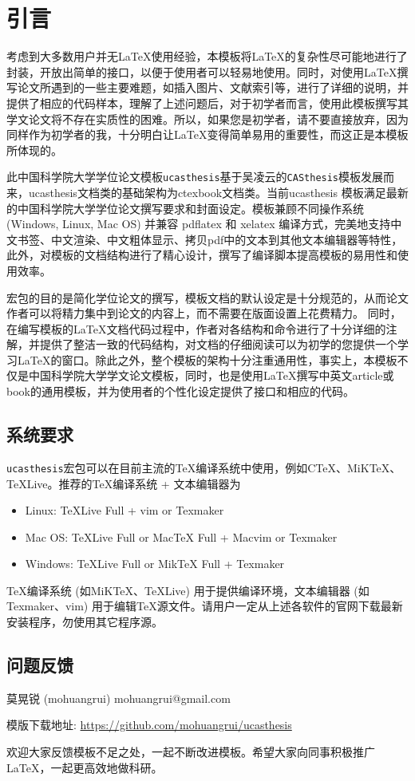 
\chapter{引言}
\label{chap:introduction}

考虑到大多数用户并无\LaTeX{}使用经验，本模板将\LaTeX{}的复杂性尽可能地进行了封装，开放出简单的接口，以便于使用者可以轻易地使用。同时，对使用\LaTeX{}撰写论文所遇到的一些主要难题，如插入图片、文献索引等，进行了详细的说明，并提供了相应的代码样本，理解了上述问题后，对于初学者而言，使用此模板撰写其学文论文将不存在实质性的困难。所以，如果您是初学者，请不要直接放弃，因为同样作为初学者的我，十分明白让\LaTeX{}变得简单易用的重要性，而这正是本模板所体现的。

此中国科学院大学学位论文模板\texttt{ucasthesis}基于吴凌云的\texttt{CASthesis}模板发展而来，ucasthesis文档类的基础架构为ctexbook文档类。当前ucasthesis 模板满足最新的中国科学院大学学位论文撰写要求和封面设定。模板兼顾不同操作系统 (Windows, Linux, Mac OS) 并兼容 pdflatex 和 xelatex 编译方式，完美地支持中文书签、中文渲染、中文粗体显示、拷贝pdf中的文本到其他文本编辑器等特性，此外，对模板的文档结构进行了精心设计，撰写了编译脚本提高模板的易用性和使用效率。

宏包的目的是简化学位论文的撰写，模板文档的默认设定是十分规范的，从而论文作者可以将精力集中到论文的内容上，而不需要在版面设置上花费精力。 同时，在编写模板的\LaTeX{}文档代码过程中，作者对各结构和命令进行了十分详细的注解，并提供了整洁一致的代码结构，对文档的仔细阅读可以为初学的您提供一个学习\LaTeX{}的窗口。除此之外，整个模板的架构十分注重通用性，事实上，本模板不仅是中国科学院大学学文论文模板，同时，也是使用\LaTeX{}撰写中英文article或book的通用模板，并为使用者的个性化设定提供了接口和相应的代码。

\section{系统要求}\label{sec:system}

\texttt{ucasthesis}宏包可以在目前主流的\TeX{}编译系统中使用，例如C\TeX{}、MiK\TeX{}、\TeX{}Live。推荐的\TeX{}编译系统 + 文本编辑器为
\begin{itemize}
    \item Linux: \TeX{}Live Full + vim or Texmaker
    \item Mac OS: \TeX{}Live Full or Mac\TeX{} Full + Macvim or Texmaker
    \item Windows: \TeX{}Live Full or Mik\TeX{} Full + Texmaker
\end{itemize}
\TeX{}编译系统 (如MiK\TeX{}、\TeX{}Live) 用于提供编译环境，文本编辑器 (如Texmaker、vim) 用于编辑\TeX{}源文件。请用户一定从上述各软件的官网下载最新安装程序，勿使用其它程序源。

\section{问题反馈}

\begin{center}
莫晃锐 (mohuangrui) \quad mohuangrui@gmail.com

模版下载地址: \url{https://github.com/mohuangrui/ucasthesis}
\end{center}

欢迎大家反馈模板不足之处，一起不断改进模板。希望大家向同事积极推广\LaTeX{}，一起更高效地做科研。
